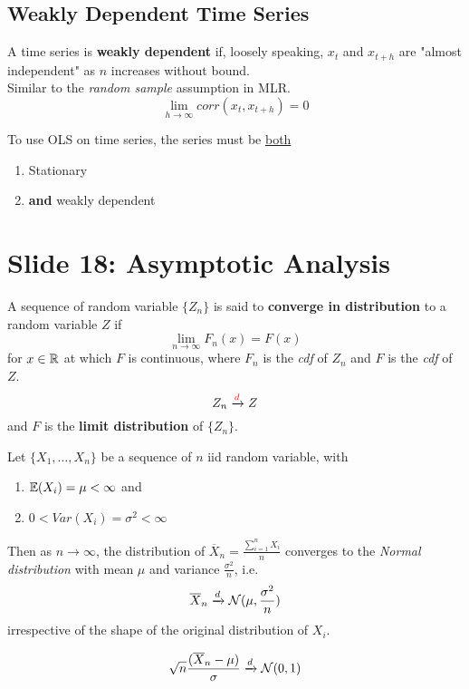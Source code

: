 \documentclass[]{article}
\begin{document}
		\subsection{Weakly Dependent Time Series}
			\begin{definition}
				A time series is \textbf{weakly dependent} if, loosely speaking, $x_{t}$ and $x_{t+h}$ are "almost independent" as $n$ increases without bound. \\
				Similar to the \emph{random sample} assumption in MLR. \\
				\[
					\lim_{h\to \infty} corr(x_t, x_{t+h}) = 0
				\]
			\end{definition}
		\begin{remark}
			To use OLS on time series, the series must be \ul{both}
			\begin{enumerate}
				\item Stationary
				\item \textbf{and} weakly dependent
			\end{enumerate}
		\end{remark}
	
	\section{Slide 18: Asymptotic Analysis}
		\begin{definition}
			A sequence of random variable $\{Z_n\}$ is said to \textbf{converge in distribution} to a random variable $Z$ if 
			\[
				\lim_{n \to \infty} F_n(x) = F(x)
			\]
			for $x \in \mathbb{R}$ at which $F$ is continuous, where $F_n$ is the \emph{cdf} of $Z_n$ and $F$ is the \emph{cdf} of $Z$.
			\[
				Z_n \xrightarrow{\textcolor{red}{d}} Z
			\]
			and $F$ is the \textbf{limit distribution} of $\{Z_n\}$.
		\end{definition}
		
		\begin{theorem}
			Let $\{X_1, \dots, X_n\}$ be a sequence of $n$ iid random variable, with 
			\begin{enumerate}
				\item $\mathbb{E}({X_i}) = \mu < \infty$ and
				\item $0 < Var(X_i) = \sigma^2 < \infty$
			\end{enumerate}
			Then as $n \to \infty$, the distribution of $\overline{X}_n = \frac{\sum_{i=1}^n X_i}{n}$ converges to the \emph{Normal distribution} with mean $\mu$ and variance $\frac{\sigma^2}{n}$, i.e.
			\[
				\overline{X}_n \xrightarrow{d} \mathcal{{N}}(\mu, \frac{\sigma^2}{n})
			\]
			irrespective of the shape of the original distribution of $X_i$.
		\end{theorem}
		\begin{corollary}
			\[
				\sqrt{n} \frac{(\overline{X}_n - \mu)}{\sigma} \xrightarrow{d} \mathcal{{N}}(0,1)
			\]
		\end{corollary}
		
\end{document}
